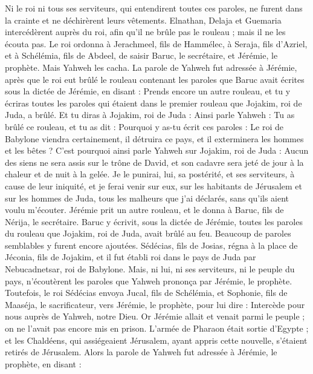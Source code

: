 \begin{multicols}{2}
Ni le roi ni tous ses serviteurs, qui entendirent toutes ces paroles, ne furent dans la crainte et ne déchirèrent leurs vêtements.
Elnathan, Delaja et Guemaria intercédèrent auprès du roi, afin qu'il ne brûle pas le rouleau ; mais il ne les écouta pas.
Le roi ordonna à Jerachmeel, fils de Hammélec, à Seraja, fils d’Azriel, et à Schélémia, fils de Abdeel, de saisir Baruc, le secrétaire, et Jérémie, le prophète. Mais Yahweh les cacha.
La parole de Yahweh fut adressée à Jérémie, après que le roi eut brûlé le rouleau contenant les paroles que Baruc avait écrites sous la dictée de Jérémie, en disant :
Prends encore un autre rouleau, et tu y écriras toutes les paroles qui étaient dans le premier rouleau que Jojakim, roi de Juda, a brûlé.
Et tu diras à Jojakim, roi de Juda : Ainsi parle Yahweh : Tu as brûlé ce rouleau, et tu as dit : Pourquoi y as-tu écrit ces paroles : Le roi de Babylone viendra certainement, il détruira ce pays, et il exterminera les hommes et les bêtes ?
C'est pourquoi ainsi parle Yahweh sur Jojakim, roi de Juda : Aucun des siens ne sera assis sur le trône de David, et son cadavre sera jeté de jour à la chaleur et de nuit à la gelée.
Je le punirai, lui, sa postérité, et ses serviteurs, à cause de leur iniquité, et je ferai venir sur eux, sur les habitants de Jérusalem et sur les hommes de Juda, tous les malheurs que j’ai déclarés, sans qu’ils aient voulu m’écouter.
Jérémie prit un autre rouleau, et le donna à Baruc, fils de Nérija, le secrétaire. Baruc y écrivit, sous la dictée de Jérémie, toutes les paroles du rouleau que Jojakim, roi de Juda, avait brûlé au feu. Beaucoup de paroles semblables y furent encore ajoutées.
\VerseOne{}Sédécias, fils de Josias, régna à la place de Jéconia, fils de Jojakim, et il fut établi roi dans le pays de Juda par Nebucadnetsar, roi de Babylone.
Mais, ni lui, ni ses serviteurs, ni le peuple du pays, n'écoutèrent les paroles que Yahweh prononça par Jérémie, le prophète.
Toutefois, le roi Sédécias envoya Jucal, fils de Schélémia, et Sophonie, fils de Maaséja, le sacrificateur, vers Jérémie, le prophète, pour lui dire : Intercède pour nous auprès de Yahweh, notre Dieu.
Or Jérémie allait et venait parmi le peuple ; on ne l'avait pas encore mis en prison.
L'armée de Pharaon était sortie d'Egypte ; et les Chaldéens, qui assiégeaient Jérusalem, ayant appris cette nouvelle, s’étaient retirés de Jérusalem.
Alors la parole de Yahweh fut adressée à Jérémie, le prophète, en disant :

\end{multicols}
